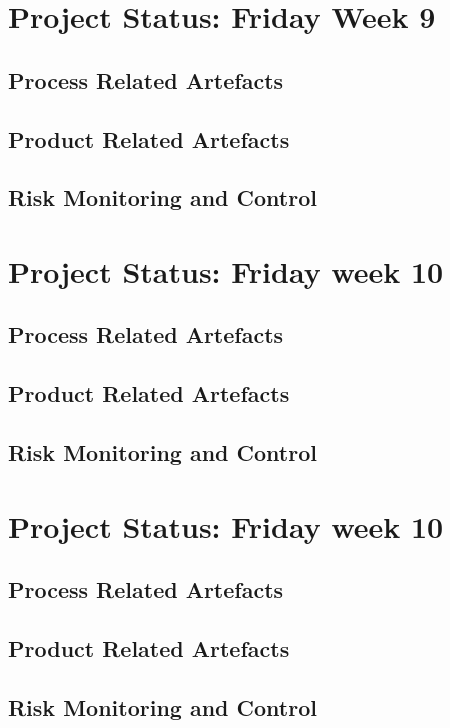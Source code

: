 \documentclass{report}
\begin{document}
\section{Project Status: Friday Week 9}
\subsection{Process Related Artefacts}
\subsection{Product Related Artefacts}
\subsection{Risk Monitoring and Control}
\section{Project Status: Friday week 10}
\subsection{Process Related Artefacts}
\subsection{Product Related Artefacts}
\subsection{Risk Monitoring and Control}
\section{Project Status: Friday week 10}
\subsection{Process Related Artefacts}
\subsection{Product Related Artefacts}
\subsection{Risk Monitoring and Control}
\end{document}
